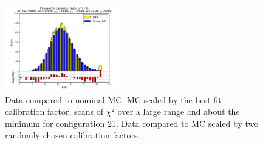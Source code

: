 \begin{figure}[htbp]
\begin{center}
\includegraphics[width=0.45\textwidth]{../FIGURES/21/FIG_Fit_result_for_calibration_factor_of_1_193.pdf} 
\caption{Data compared to nominal MC, MC scaled by the best fit calibration factor, scans of $\chi^2$ over a large range and about the minimum for configuration 21. Data compared to MC scaled by two randomly chosen calibration factors.} 
\label{tab:best_21} 
\end{center} \end{figure} 

